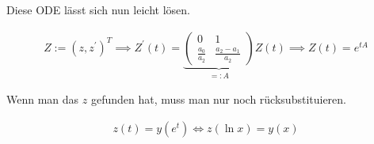 \begin{solution}
Diese ODE lässt sich nun leicht lösen.

\begin{align*}
    Z := (z, z^\prime)^T
    \implies
    Z^\prime(t)
    =
    \underbrace
    {
        \begin{pmatrix}
            0               & 1 \\
            \frac{a_0}{a_2} & \frac{a_2 - a_1}{a_2}
        \end{pmatrix}
    }_{=: A}
    Z(t)
    \implies
    Z(t) = e^{tA}
\end{align*}

Wenn man das $z$ gefunden hat, muss man nur noch rücksubstituieren.

\begin{align*}
    z(t) = y(e^t)
    \iff
    z(\ln{x}) = y(x)
\end{align*}

\end{solution}

